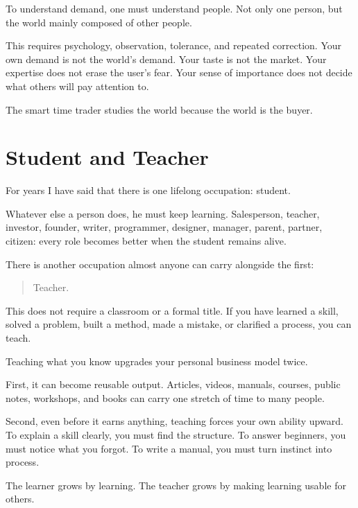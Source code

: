 To understand demand, one must understand people. Not only one person, but the world mainly composed of other people.

This requires psychology, observation, tolerance, and repeated correction. Your own demand is not the world's demand. Your taste is not the market. Your expertise does not erase the user's fear. Your sense of importance does not decide what others will pay attention to.

The smart time trader studies the world because the world is the buyer.

\section*{Student and Teacher}

For years I have said that there is one lifelong occupation: student.

Whatever else a person does, he must keep learning. Salesperson, teacher, investor, founder, writer, programmer, designer, manager, parent, partner, citizen: every role becomes better when the student remains alive.

There is another occupation almost anyone can carry alongside the first:

\begin{quote}
Teacher.
\end{quote}

This does not require a classroom or a formal title. If you have learned a skill, solved a problem, built a method, made a mistake, or clarified a process, you can teach.

Teaching what you know upgrades your personal business model twice.

First, it can become reusable output. Articles, videos, manuals, courses, public notes, workshops, and books can carry one stretch of time to many people.

Second, even before it earns anything, teaching forces your own ability upward. To explain a skill clearly, you must find the structure. To answer beginners, you must notice what you forgot. To write a manual, you must turn instinct into process.

The learner grows by learning. The teacher grows by making learning usable for others.

